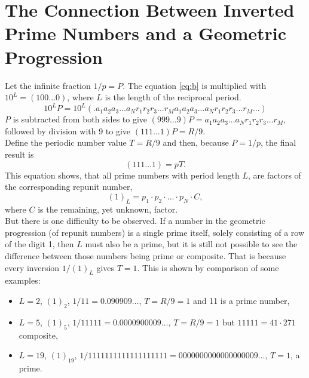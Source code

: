 \documentclass[10pt,twoside,a4paper]{amsart}
\begin{document}
\section{The Connection Between Inverted Prime Numbers and a Geometric Progression}
\label{sect:cbipn}
Let the infinite fraction $1/p = P$. The equation \ref{eq:b} is multiplied with $10^{L} = (100...0)$, where $L$ is the length of the reciprocal period.
\begin{equation}
\label{eq:c}
10^{L}P = 10^{L}(.a_{1}a_{2}a_{3}...a_{N}r_{1}r_{2}r_{3}...r_{M}a_{1}a_{2}a_{3}...a_{N}r_{1}r_{2}r_{3}...r_{M}...)
\end{equation}
$P$ is subtracted from both sides to give $(999\ldots{}9)P = a_{1}a_{2}a_{3}\ldots{}a_{N}r_{1}r_{2}r_{3}\ldots{}r_{M}$, followed by division with 9 to give $(111\ldots{}1)P = R/9$.\\
Define the periodic number value $T = R/9$ and then, because $P = 1/p$, the final result is
\begin{equation}
\label{eq:d}
(111...1) = pT.
\end{equation}
This equation shows, that all prime numbers with period length $L$, are factors of the corresponding repunit number,  
\begin{equation}
\label{eq:primeprod}
(1)_{L} = p_{1}\cdot p_{2}\cdot \ldots \cdot p_{N}\cdot C,
\end{equation}
where $C$ is the remaining, yet unknown, factor.\\
But there is one difficulty to be observed. If a number in the geometric progression (of repunit numbers) is a single prime itself, solely consisting of a row of the digit 1, then $L$ must also be a prime, but it is still not possible to see the difference between those numbers being prime or composite. That is because every inversion $1/(1)_{L}$ gives $T = 1$. This is shown by comparison of some examples:
\\
\begin{itemize}
\item[] $L=2$, $(1)_{2}$, $1/11=0.090909\ldots$, $T=R/9=1$ and 11 is a prime number,\\
\item[] $L=5$, $(1)_{5}$, $1/11111=0.0000900009\ldots$, $T=R/9=1$ but $11111 = 41\cdot 271$ composite,\\
\item[] $L=19$, $(1)_{19}$, $1/1111111111111111111 = 0000000000000000009\ldots$, $T = 1$, a prime.\\
\end{itemize}
\end{document}
